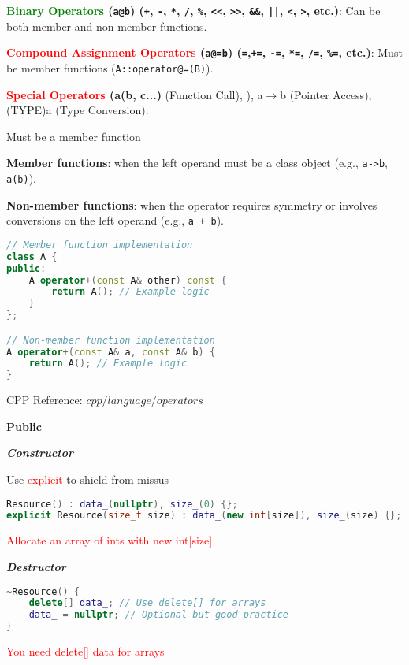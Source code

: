 \documentclass[fontsize=8pt, a4paper, landscape, fleqn]{scrartcl}
\renewcommand{\subsection}[1]{%
    \noindent\colorbox{subsectioncolor}{%
        \parbox{\dimexpr\columnwidth-2\fboxsep}{\color{white}\textbf{#1}}}%
    \vspace{0.5mm}%
}
\renewcommand{\subsubsection}[1]{%
    \noindent\textbf{\textit{\color{subsectioncolor}#1}}%
    \vspace{1mm}%
}
\begin{document}
\begin{multicols*}{3}[\raggedcolumns]
\textbf{\textcolor{green}{Binary Operators} (\texttt{a@b}) (\texttt{+}, \texttt{-}, \texttt{*}, \texttt{/}, \texttt{\%}, \texttt{<<}, \texttt{>>}, \texttt{\&\&}, \texttt{||}, \texttt{<}, \texttt{>}, etc.)}:  
Can be both member and non-member functions.

\textbf{\textcolor{red}{Compound Assignment Operators} (\texttt{a@=b}) (\texttt{=},\texttt{+=}, \texttt{-=}, \texttt{*=}, \texttt{/=}, \texttt{\%=}, etc.)}:  
Must be member functions (\texttt{A::operator@=(B)}).

\textbf{\textcolor{red}{Special Operators} (a(b, c...)}{ (Function Call), ), a$\rightarrow$b (Pointer Access), (TYPE)a (Type Conversion)}:

Must be a member function 

\textbf{Member functions}: when the left operand must be a class object (e.g., \texttt{a->b}, \texttt{a(b)}).

\textbf{Non-member functions}: when the operator requires symmetry or involves conversions on the left operand (e.g., \texttt{a + b}).
\begin{lstlisting}[language=C++, breaklines]
// Member function implementation
class A {
public:
    A operator+(const A& other) const {
        return A(); // Example logic
    }
};

// Non-member function implementation
A operator+(const A& a, const A& b) {
    return A(); // Example logic
}
\end{lstlisting}

\noindent CPP Reference: $cpp/language/operators$

    \subsection{Public}
    \subsubsection{Constructor} 
    Use \textcolor{red}{explicit} to shield from missus
    \begin{lstlisting}[language=C++, breaklines]
Resource() : data_(nullptr), size_(0) {};
explicit Resource(size_t size) : data_(new int[size]), size_(size) {};
\end{lstlisting}
\textcolor{red}{Allocate an array of ints with new int[size]}

\subsubsection{Destructor} 
    \begin{lstlisting}[language=C++, breaklines]
~Resource() {
    delete[] data_; // Use delete[] for arrays
    data_ = nullptr; // Optional but good practice
}\end{lstlisting}
\textcolor{red}{You need delete[] data for arrays}


\end{multicols*}
\end{document}
